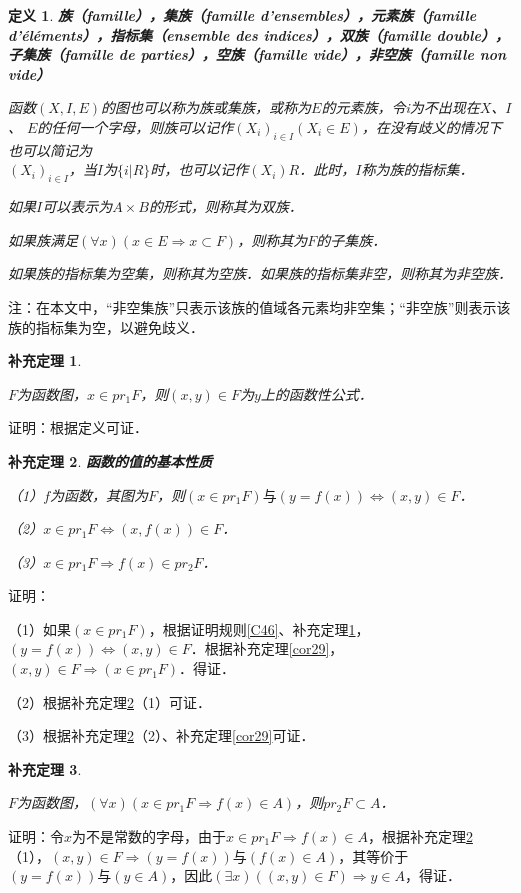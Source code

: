 \documentclass[12pt, a4paper, oneside]{book}
\newtheorem{cor}{补充定理}
\newtheorem{de}{定义}
\begin{document}
			\begin{de}
				\textbf{族（famille），集族（famille d'ensembles），元素族（famille d'éléments），指标集（ensemble des indices），双族（famille double），子集族（famille de parties），空族（famille vide），非空族（famille non vide）}
				\par
				函数$(X, I, E)$的图也可以称为族或集族，或称为$E$的元素族，令i为不出现在$X$、$I$、
				$E$的任何一个字母，则族可以记作$(X_i)_{i\in I}(X_i\in E)$，在没有歧义的情况下也可以简记为\\$(X_i)_{i\in I}$，当$I$为$\{i|R\}$时，也可以记作$(X_i)R$．此时，$I$称为族的指标集．
				\par
				如果$I$可以表示为$A\times B$的形式，则称其为双族．
				\par
				如果族满足$(\forall x)(x\in E\Rightarrow x\subset F)$，则称其为$F$的子集族．			
				\par
				如果族的指标集为空集，则称其为空族．如果族的指标集非空，则称其为非空族．
			\end{de}
			注：在本文中，“非空集族”只表示该族的值域各元素均非空集；“非空族”则表示该族的指标集为空，以避免歧义．
			
			\begin{cor}\label{cor63}
				\hfill\par
				$F$为函数图，$x\in pr_1F$，则$(x, y)\in F$为$y$上的函数性公式．
			\end{cor}
			证明：根据定义可证．
			
			\begin{cor}\label{cor64}
				\textbf{函数的值的基本性质}
				\par
				（1）$f$为函数，其图为$F$，则$(x\in pr_1F)\text{与}(y=f(x))\Leftrightarrow (x, y)\in F$．
				\par
				（2）$x\in pr_1F\Leftrightarrow (x, f(x))\in F$．
				\par
				（3）$x\in pr_1F\Rightarrow f(x)\in pr_2F$．
			\end{cor}
			证明：
			\par
			（1）如果$(x\in pr_1F)$，根据证明规则\ref{C46}、补充定理\ref{cor63}，$(y=f(x))\Leftrightarrow (x, y)\in F$．根据补充定理\ref{cor29}，$(x, y)\in F\Rightarrow (x\in pr_1F)$．得证．
			\par
			（2）根据补充定理\ref{cor64}（1）可证．
			\par
			（3）根据补充定理\ref{cor64}（2）、补充定理\ref{cor29}可证．
			
			\begin{cor}\label{cor65}
				\hfill\par
				$F$为函数图，$(\forall x)(x\in pr_1F\Rightarrow f(x)\in A)$，则$pr_2F\subset A$．
			\end{cor}
			证明：令$x$为不是常数的字母，由于$x\in pr_1F\Rightarrow f(x)\in A$，根据补充定理\ref{cor64}（1），$(x, y)\in F\Rightarrow (y=f(x))\text{与}(f(x)\in A)$，其等价于$(y=f(x))\text{与}(y\in A)$，因此$(\exists x)((x, y)\in F)\Rightarrow y\in A$，得证．
			
\end{document}
